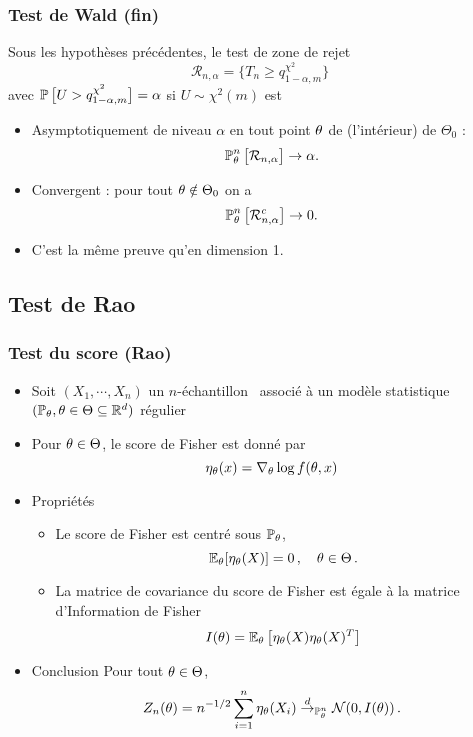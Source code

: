 \begin{frame}
\frametitle{Test de Wald (fin)}
\begin{prop}
Sous les hypothèses précédentes, le test de zone de rejet
$${\mathcal R}_{n,\alpha}  = \big\{T_n \geq q_{1-\alpha, m}^{\chi^2}\big\}$$
avec $\operatorname{{\mathbb P}}\big[U > q_{1-\alpha, m}^{\chi^2}\big]=\alpha$ si $U \sim \chi^2(m)$ est
\begin{itemize}
\item \alert{Asymptotiquement de niveau $\alpha$} en tout point $\theta$ de (l'intérieur) de $\Theta_0$ :
$$\operatorname{{\mathbb P}}_\theta^n\big[ {\mathcal R}_{n,\alpha}\big]\rightarrow \alpha.$$
\item \alert{Convergent} : pour tout $\theta \notin \Theta_0$ on a
$$\operatorname{{\mathbb P}}_\theta^n\big[{\mathcal R}_{n,\alpha}^c\big]\rightarrow 0.$$
\end{itemize}
\end{prop}
\begin{itemize}
\item C'est la  même preuve qu'en dimension 1.
\end{itemize}
\end{frame}



\subsection{Test de Rao}


\begin{frame}
\frametitle{Test du score (Rao)}
\begin{itemize}
\item Soit $(X_1, \cdots, X_n)$ un $n$-échantillon \iid\ associé à un modèle statistique $(\operatorname{{\mathbb P}}_\theta, \theta \in \Theta \subseteq \mathbb{R}^d)$  \alert{régulier}
\item Pour $\theta \in \Theta$, le \alert{score de Fisher} est donné par
\[
\eta_{\theta}(x)= \nabla_{\theta} \log f(\theta,x)
\]
\item \alert{Propriétés}
\begin{itemize}
\item Le score de Fisher est centré sous $\operatorname{{\mathbb P}}_{\theta}$,
$$
\operatorname{{\mathbb E}}_{\theta}[\eta_{\theta}(X)]= 0 \,, \quad \theta \in \Theta \,.
$$
\item La matrice de covariance du score de Fisher est égale à la \alert{matrice d'Information de Fisher}
$$
I(\theta)= \operatorname{{\mathbb E}}_{\theta} \left[ \eta_{\theta}(X) \eta_{\theta}(X)^T \right]
$$
\end{itemize}
\item \alert{Conclusion} Pour tout $\theta \in \Theta$,
$$
Z_n(\theta) = n^{-1/2} \sum_{i=1}^n \eta_\theta(X_i) \stackrel{d}{\rightarrow}_{\operatorname{{\mathbb P}}_{\theta}^n} \mathcal{N}(0, I(\theta)) \,.
$$
\end{itemize}
\end{frame}

